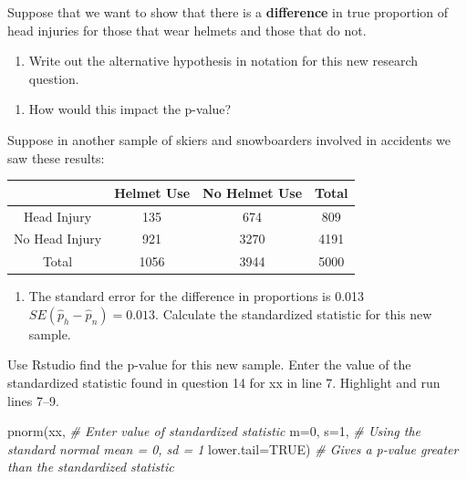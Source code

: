 \documentclass[
]{report}
\newenvironment{Shaded}{\begin{snugshade}}{\end{snugshade}}
\newcommand{\AttributeTok}[1]{\textcolor[rgb]{0.77,0.63,0.00}{#1}}
\newcommand{\CommentTok}[1]{\textcolor[rgb]{0.56,0.35,0.01}{\textit{#1}}}
\newcommand{\ConstantTok}[1]{\textcolor[rgb]{0.00,0.00,0.00}{#1}}
\newcommand{\DecValTok}[1]{\textcolor[rgb]{0.00,0.00,0.81}{#1}}
\newcommand{\FunctionTok}[1]{\textcolor[rgb]{0.00,0.00,0.00}{#1}}
\newcommand{\NormalTok}[1]{#1}
\providecommand{\tightlist}{%
  \setlength{\itemsep}{0pt}\setlength{\parskip}{0pt}}
\begin{document}
Suppose that we want to show that there is a \textbf{difference} in true proportion of head injuries for those that wear helmets and those that do not.

\begin{enumerate}
\def\labelenumi{\arabic{enumi}.}
\setcounter{enumi}{11}
\tightlist
\item
  Write out the alternative hypothesis in notation for this new research question.
\end{enumerate}

\vspace{0.5in}

\begin{enumerate}
\def\labelenumi{\arabic{enumi}.}
\setcounter{enumi}{12}
\tightlist
\item
  How would this impact the p-value?
\end{enumerate}

\vspace{0.2in}

Suppose in another sample of skiers and snowboarders involved in accidents we saw these results:

\begin{longtable}[]{@{}cccc@{}}
\toprule
& Helmet Use & No Helmet Use & Total \\
\midrule
\endhead
Head Injury & 135 & 674 & 809 \\
No Head Injury & 921 & 3270 & 4191 \\
Total & 1056 & 3944 & 5000 \\
\bottomrule
\end{longtable}

\begin{enumerate}
\def\labelenumi{\arabic{enumi}.}
\setcounter{enumi}{13}
\tightlist
\item
  The standard error for the difference in proportions is 0.013 \(SE(\hat{p}_h - \hat{p}_n) = 0.013\). Calculate the standardized statistic for this new sample.
\end{enumerate}

\vspace{0.8in}

Use Rstudio find the p-value for this new sample. Enter the value of the standardized statistic found in question 14 for xx in line 7. Highlight and run lines 7--9.

\begin{Shaded}
\begin{Highlighting}[]
\FunctionTok{pnorm}\NormalTok{(xx, }\CommentTok{\# Enter value of standardized statistic}
      \AttributeTok{m=}\DecValTok{0}\NormalTok{, }\AttributeTok{s=}\DecValTok{1}\NormalTok{, }\CommentTok{\# Using the standard normal mean = 0, sd = 1}
      \AttributeTok{lower.tail=}\ConstantTok{TRUE}\NormalTok{) }\CommentTok{\# Gives a p{-}value greater than the standardized statistic}
\end{Highlighting}
\end{Shaded}
\end{document}
